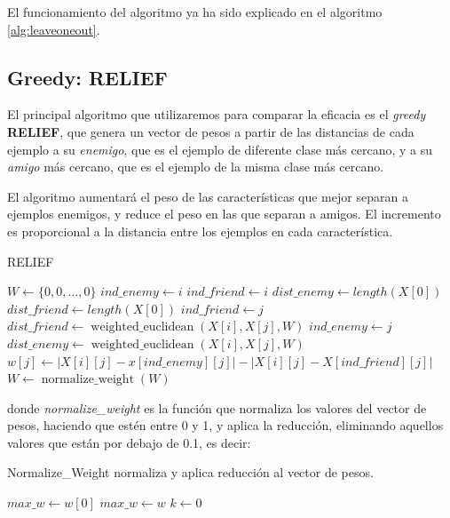\documentclass[11pt,a4paper]{article}
\begin{document}
El funcionamiento del algoritmo ya ha sido explicado en el algoritmo \ref{alg:leaveoneout}.

\subsection{Greedy: RELIEF}

El principal algoritmo que utilizaremos para comparar la eficacia es el \emph{greedy} \textbf{RELIEF}, que genera un vector de pesos a partir de las distancias de cada ejemplo a su \emph{enemigo}, que es el ejemplo de diferente clase más cercano, y a su \emph{amigo} más cercano, que es el ejemplo de la misma clase más cercano.

El algoritmo aumentará el peso de las características que mejor separan a ejemplos enemigos, y reduce el peso en las que separan a amigos. El incremento es proporcional a la distancia entre los ejemplos en cada característica.

\begin{algorithm}[H]
	\caption{{\sc RELIEF}}
	
	$W \gets \{0, 0, \dots, 0\}$ 
	 {
		$ind\_enemy \gets i$ \;
		$ind\_friend \gets i$ \;
		$dist\_enemy \gets length(X[0])$ 
		$dist\_friend \gets length(X[0])$ 
		 {
			 {
				 {
					$ind\_friend \gets j$ \;
					$dist\_friend \gets \operatorname{weighted\_euclidean}(X[i], X[j], W)$ \;
				}  {
					$ind\_enemy \gets j$ \;
					$dist\_enemy \gets \operatorname{weighted\_euclidean}(X[i], X[j], W)$ \;
				}
			}
		}
		 {
			$w[j] \gets |X[i][j] - x[ind\_enemy][j]| - |X[i][j] - X[ind\_friend][j]|$ \;
		}
	}
	$W \gets \operatorname{normalize\_weight}(W)$ \;
	 \;
\end{algorithm}
donde \emph{normalize\_weight} es la función que normaliza los valores del vector de pesos, haciendo que estén entre 0 y 1, y aplica la reducción, eliminando aquellos valores que están por debajo de 0.1, es decir: \\
\begin{algorithm}[H]
	\caption{{\sc Normalize\_Weight} normaliza y aplica reducción al vector de pesos.}
	
	$max\_w \gets w[0]$ \;
	 {
		 {
			$max\_w \gets w$ \;
		}
	}
	 {
		 {
			$k \gets 0$ \;
		} 
	}
	 \;
\end{algorithm}
\end{document}
